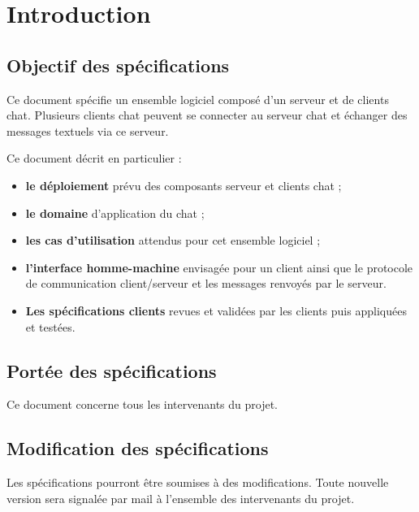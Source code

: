 %

\section{Introduction}
\label{sec:introduction}

\subsection{Objectif des spécifications}
\label{subsec:introduction:objectif}

Ce document spécifie un ensemble logiciel composé d'un serveur et de clients chat.
Plusieurs clients chat peuvent se connecter au serveur chat et échanger des messages textuels via ce serveur.

\smallskip
Ce document décrit en particulier :
\begin{itemize}
\smallskip
\item \textbf{le déploiement} prévu des composants serveur et clients chat ;
\smallskip
\item \textbf{le domaine} d'application du chat ;
\smallskip
\item \textbf{les cas d'utilisation} attendus pour cet ensemble logiciel ;
\smallskip
\item \textbf{l'interface homme-machine} envisagée pour un client ainsi que le protocole de communication client/serveur et les messages renvoyés par le serveur.
\smallskip
\item \textbf{Les spécifications clients} revues et validées par les clients puis appliquées et testées.
\end{itemize}


\subsection{Portée des spécifications}
\label{subsec:introduction:portee}

Ce document concerne tous les intervenants du projet.

\subsection{Modification des spécifications}
\label{subsec:introdtion:modification}

Les spécifications pourront être soumises à des modifications. 
Toute nouvelle version sera signalée par mail à l'ensemble des intervenants du projet.

